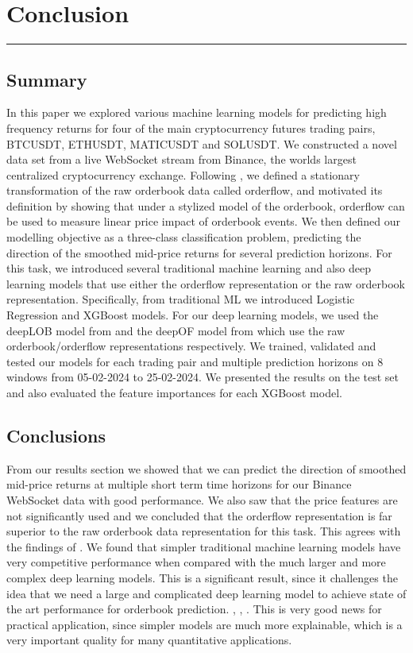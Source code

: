 \chapter{Conclusion}
\hrule
\vspace{40pt}

\section{Summary}
In this paper we explored various machine learning models for predicting high frequency returns
for four of the main cryptocurrency futures trading pairs, BTCUSDT, ETHUSDT, MATICUSDT and SOLUSDT. 
We constructed a novel data set from a live WebSocket stream from Binance, the worlds largest centralized cryptocurrency exchange.
Following \cite{CONT2013}, we defined a stationary transformation of the raw orderbook data called orderflow, 
and motivated its definition by showing that under a stylized model of the orderbook, orderflow can be used to measure linear price impact
of orderbook events. We then defined our modelling objective as a three-class classification problem, predicting the direction of the smoothed
mid-price returns for several prediction horizons. For this task, we introduced several traditional machine learning and also deep learning
models that use either the orderflow representation or the raw orderbook representation. Specifically, from traditional ML we introduced
Logistic Regression and XGBoost models. For our deep learning models, we used the deepLOB model from \cite{ZHANG2019} and the deepOF model
from \cite{KOLM2023} which use the raw orderbook/orderflow representations respectively.
We trained, validated and tested our models for each trading pair and multiple prediction horizons on 8 windows from 05-02-2024 to 25-02-2024.
We presented the results on the test set and also evaluated the feature importances for each XGBoost model.

\section{Conclusions}
From our results section we showed that we can predict the direction of smoothed mid-price returns at 
multiple short term time horizons for our Binance WebSocket data with good performance.
We also saw that the price features are not significantly used and we concluded that the orderflow representation is far superior
to the raw orderbook data representation for this task. This agrees with the findings of \cite{KOLM2023}.
We found that simpler traditional machine learning models have very competitive performance when compared with the much larger
and more complex deep learning models. This is a significant result, since it challenges the idea that we need a large and complicated
deep learning model to achieve state of the art performance for orderbook prediction. \cite{ZHANG2019}, \cite{KOLM2023}, \cite{LUCCHESE2024}.
This is very good news for practical application, since simpler models are much more explainable, which is a very important quality
for many quantitative applications.

